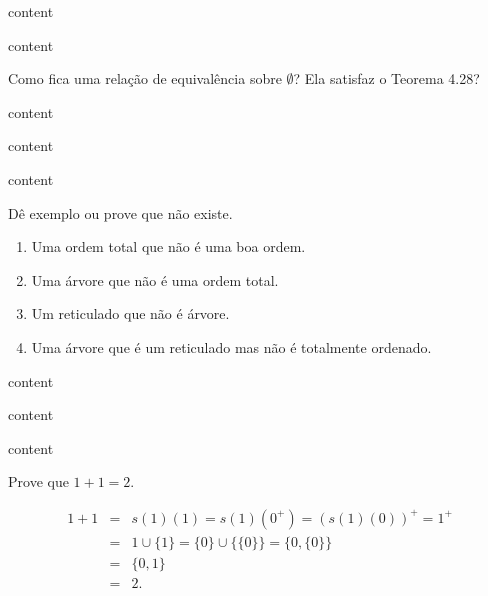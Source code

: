 \begin{exercicio}
	content
\end{exercicio}
\begin{solucao}
	content
\end{solucao}

\begin{exercicio}
	Como fica uma relação de equivalência sobre $\emptyset$? Ela satisfaz o Teorema 4.28?
\end{exercicio}
\begin{solucao}
	content
\end{solucao}

\begin{exercicio}
	content
\end{exercicio}
\begin{solucao}
	content
\end{solucao}

\begin{exercicio}
	Dê exemplo ou prove que não existe.
	\begin{enumerate}[label=(\alph{*})]
		\item Uma ordem total que não é uma boa ordem.
		\item Uma árvore que não é uma ordem total.
		\item Um reticulado que não é árvore.
		\item Uma árvore que é um reticulado mas não é totalmente ordenado.
	\end{enumerate}
\end{exercicio}
\begin{solucao}
	content
\end{solucao}

\begin{exercicio}
	content
\end{exercicio}
\begin{solucao}
	content
\end{solucao}

\begin{exercicio}
	Prove que $1+1=2$.
\end{exercicio}
\begin{solucao}
	\begin{eqnarray*}
		1+1&=&s(1)(1)=s(1)(0^+)=(s(1)(0))^+=1^+ \\
		&=&1\cup\{1\}=\{0\}\cup\{\{0\}\}=\{0,\{0\}\} \\
		&=&\{0,1\} \\
		&=&2.
	\end{eqnarray*}
\end{solucao}

